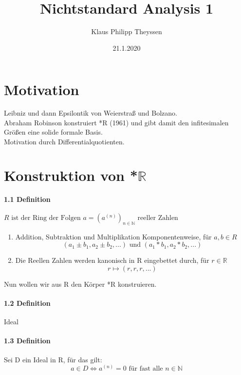 \documentclass[a4paper]{article}
\title{Nichtstandard Analysis 1}
\date{21.1.2020}
\author{Klaus Philipp Theyssen}
\begin{document}
\maketitle


\section{Motivation}
Leibniz und dann Epsilontik von Weierstraß und Bolzano.\\
Abraham Robinson konstruiert *R (1961) und gibt damit den infitesimalen Größen eine solide formale Basis. \\
Motivation durch Differentialquotienten.

\section{Konstruktion von *$\mathbb{R}$}
\paragraph{1.1 Definition} $ R \text{ ist der Ring der Folgen }  a = (a^{(n)})_{n \in \mathbb{N}} \text{ reeller Zahlen} $
\begin{enumerate}
      \item Addition, Subtraktion und Multiplikation Komponentenweise, für $a, b \in R$  
            $$ (a_1 \pm b_1, a_2 \pm b_2,...) \text{ und } (a_1 * b_1, a_2 * b_2,...) $$ 
      \item Die Reellen Zahlen werden kanonisch in R eingebettet durch, für $ r \in \mathbb{R} $ 
            $$ r \mapsto (r,r,r,...) $$
\end{enumerate}

Nun wollen wir aus R den Körper *R konstruieren. 

\paragraph{1.2 Definition} Ideal

\paragraph{1.3 Definition} Sei D ein Ideal in R, für das gilt:  
      $$ a \in D \iff a^{(n)} = 0 \text{ für fast alle } n \in \mathbb{N}  $$
\end{document}
